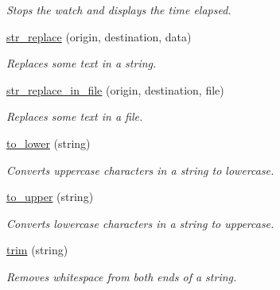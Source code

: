 \begin{DoxyCompactItemize}
\begin{DoxyCompactList}\small\item\em Stops the watch and displays the time elapsed. \end{DoxyCompactList}\item 
\hyperlink{group__string_ga8a33cb1aa9a5e78d96dc840a2fb9e7aa}{str\+\_\+replace} (origin, destination, data)
\begin{DoxyCompactList}\small\item\em Replaces some text in a string. \end{DoxyCompactList}\item 
\hyperlink{group__string_gac21da88366bc39ab15e65991d7adddb5}{str\+\_\+replace\+\_\+in\+\_\+file} (origin, destination, file)
\begin{DoxyCompactList}\small\item\em Replaces some text in a file. \end{DoxyCompactList}\item 
\hyperlink{group__string_gaab92d8135788d0b552db394c4510ffd1}{to\+\_\+lower} (string)
\begin{DoxyCompactList}\small\item\em Converts uppercase characters in a string to lowercase. \end{DoxyCompactList}\item 
\hyperlink{group__string_ga47b18ef89979fd9f9f295177fbe9e9ff}{to\+\_\+upper} (string)
\begin{DoxyCompactList}\small\item\em Converts lowercase characters in a string to uppercase. \end{DoxyCompactList}\item 
\hyperlink{group__string_gaf851f60e0e4d97390e67c9c0d49e1172}{trim} (string)
\begin{DoxyCompactList}\small\item\em Removes whitespace from both ends of a string. \end{DoxyCompactList}\end{DoxyCompactItemize}
